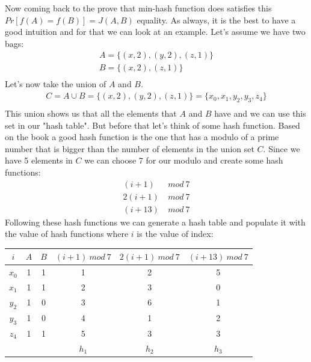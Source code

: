 \documentclass[11pt,a4paper,english]{article}
\begin{document}
\begin{enumerate}
\begin{enumerate}
            Now coming back to the prove that min-hash function does satisfies this $Pr[f(A)= f(B)]=J(A,B)$ equality. As always, it is the best to have a good intuition and for that we can look at an example. Let's assume we have two bags:
            \begin{align*}
              A = \{ (x,2), (y,2), (z,1) \} \\
              B = \{ (x,2), (z,1) \} \\
            \end{align*}
            Let's now take the union of $A$ and $B$.
            \begin{align*}
              C = A \cup B = \{ (x,2), (y,2), (z,1) \} = \{ x_0, x_1, y_2, y_3, z_4 \} \\
            \end{align*}
            This union shows us that all the elements that $A$ and $B$ have and we can use this set in our "hash table". But before that let's think of some hash function. Based on the book a good hash function is the one that has a modulo of a prime number that is bigger than the number of elements in the union set $C$. Since we have 5 elements in $C$ we can choose $7$ for our modulo and create some hash functions:
            \begin{align*}
               (i + 1) & \ mod \ 7 \\
              2(i + 1) & \ mod \ 7 \\
              (i + 13) & \ mod \ 7
            \end{align*}
            Following these hash functions we can generate a hash table and populate it with the value of hash functions where $i$ is the value of index: \\
            \begin{center}
              \begin{tabular}{c | c | c || c | c | c}
                $i$   & $A$ & $B$ & $(i + 1) \ mod \ 7$ & $2(i + 1) \ mod \ 7$ & $(i + 13) \ mod \ 7$ \\ \hline \hline
                $x_0$ &  1  &  1  &       1       &       2        &      5         \\
                $x_1$ &  1  &  1  &       2       &       3        &      0         \\
                $y_2$ &  1  &  0  &       3       &       6        &      1         \\
                $y_3$ &  1  &  0  &       4       &       1        &      2         \\
                $z_4$ &  1  &  1  &       5       &       3        &      3         \\  \hline
                      &     &     &     $h_1$     &     $h_2$      &     $h_3$      \\
              \end{tabular}
            \end{center}


\end{enumerate}
\end{enumerate}
\end{document}
